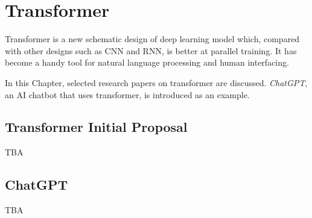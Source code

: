 \chapter{Transformer}

Transformer is a new schematic design of deep learning model which, compared with other designs such as CNN and RNN, is better at parallel training. It has become a handy tool for natural language processing and human interfacing.

In this Chapter, selected research papers on transformer are discussed. \textit{ChatGPT}, an AI chatbot that uses transformer, is introduced as an example.

\section{Transformer Initial Proposal}

TBA

\section{ChatGPT}

TBA